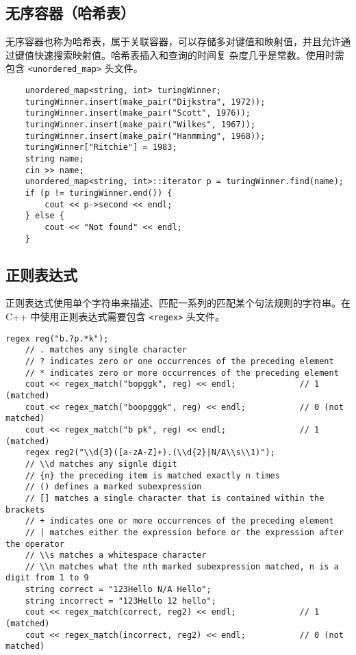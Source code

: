 \documentclass[UTF8]{ctexart}
\begin{document}
\subsection{无序容器（哈希表）}
无序容器也称为哈希表，属于关联容器，可以存储多对键值和映射值，并且允许通过键值快速搜索映射值。哈希表插入和查询的时间复
杂度几乎是常数。使用时需包含 \texttt{<unordered\_map>} 头文件。
\begin{verbatim}
    unordered_map<string, int> turingWinner;
    turingWinner.insert(make_pair("Dijkstra", 1972));
    turingWinner.insert(make_pair("Scott", 1976));
    turingWinner.insert(make_pair("Wilkes", 1967));
    turingWinner.insert(make_pair("Hanmming", 1968));
    turingWinner["Ritchie"] = 1983;
    string name;
    cin >> name;
    unordered_map<string, int>::iterator p = turingWinner.find(name);
    if (p != turingWinner.end()) {
        cout << p->second << endl;
    } else {
        cout << "Not found" << endl;
    }
\end{verbatim}

\subsection{正则表达式}
正则表达式使用单个字符串来描述、匹配一系列的匹配某个句法规则的字符串。在 C++ 中使用正则表达式需要包含
\texttt{<regex>} 头文件。

\begin{verbatim}
regex reg("b.?p.*k");
    // . matches any single character
    // ? indicates zero or one occurrences of the preceding element
    // * indicates zero or more occurrences of the preceding element
    cout << regex_match("bopggk", reg) << endl;             // 1 (matched)
    cout << regex_match("boopgggk", reg) << endl;           // 0 (not matched)
    cout << regex_match("b pk", reg) << endl;               // 1 (matched)
    regex reg2("\\d{3}([a-zA-Z]+).(\\d{2}|N/A\\s\\1)");
    // \\d matches any signle digit
    // {n} the preceding item is matched exactly n times
    // () defines a marked subexpression
    // [] matches a single character that is contained within the brackets
    // + indicates one or more occurrences of the preceding element
    // | matches either the expression before or the expression after the operator
    // \\s matches a whitespace character
    // \\n matches what the nth marked subexpression matched, n is a digit from 1 to 9
    string correct = "123Hello N/A Hello";
    string incorrect = "123Hello 12 hello";
    cout << regex_match(correct, reg2) << endl;             // 1 (matched)
    cout << regex_match(incorrect, reg2) << endl;           // 0 (not matched)
\end{verbatim}
\end{document}
